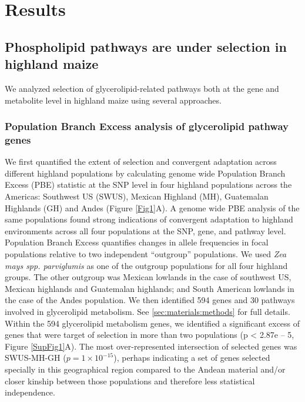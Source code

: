 \documentclass[9pt,twocolumn,twoside,lineno]{BioRxiv}
\begin{document}
\section{Results}
\label{sec:results}

\subsection{Phospholipid pathways are under selection in  highland maize} 
We analyzed selection of glycerolipid-related pathways both at the gene and metabolite level in highland maize using several approaches.
\subsubsection{Population Branch Excess analysis of glycerolipid pathway genes} 
We first quantified the extent of selection and convergent adaptation across different highland populations by calculating genome wide Population Branch Excess (PBE) statistic \cite{Pool2017-oa} at the SNP level in four highland populations across the Americas: Southwest US (SWUS), Mexican Highland (MH), Guatemalan Highlands (GH) and Andes (Figure \ref{Fig1}A). 
A genome wide PBE analysis of the same populations \cite{Wang2020-mp} found strong indications of convergent adaptation to highland environments across all four populations at the SNP, gene, and pathway level.
Population Branch Excess quantifies changes in allele frequencies in focal populations relative to two independent “outgroup” populations. 
We used \textit{Zea mays spp. parviglumis} as one of the outgroup populations for all four highland groups.  
The other outgroup was  Mexican lowlands  in the case of southwest US, Mexican highlands and Guatemalan highlands; and South American lowlands in the case of the Andes population. 
We then identified 594 genes and 30 pathways involved in glycerolipid metabolism. 
See \ref{sec:materials:methods} for full details. 
Within the 594 glycerolipid metabolism genes, we identified a significant excess of genes that were target of selection in more than two populations (p < 2.87e – 5, Figure \ref{SupFig1}A).  
The most over-represented intersection of selected genes was SWUS-MH-GH ($p = 1  \times 10 ^{-15} $), perhaps indicating a set of genes selected specially in this geographical region compared to the Andean material and/or closer kinship between those populations and therefore less statistical independence.   
\end{document}
